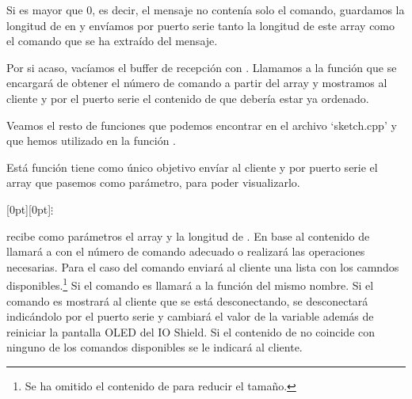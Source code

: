 
Si  es mayor que 0, es decir, el mensaje no contenía solo el comando, guardamos la longitud de  en  y envíamos por puerto serie tanto la longitud de este array como el comando que se ha extraído del mensaje.


Por si acaso, vacíamos el buffer de recepción con . Llamamos a la función  que se encargará de obtener el número de comando a partir del array  y mostramos al cliente y por el puerto serie el contenido de  que debería estar ya ordenado.

Veamos el resto de funciones que podemos encontrar en el archivo `sketch.cpp' y que hemos utilizado en la función .


Está función tiene como único objetivo envíar al cliente y por puerto serie el array que pasemos como parámetro, para poder visualizarlo.


\centerline{\raisebox{-1pt}[0pt][0pt]{$\vdots$}}

 recibe como parámetros el array  y la longitud de . En base al contenido de  llamará a  con el número de comando adecuado o realizará las operaciones necesarias. Para el caso del comando  enviará al cliente una lista con los camndos disponibles.\footnote{Se ha omitido el contenido de  para reducir el tamaño.} Si el comando es  llamará a la función del mismo nombre. Si el comando es  mostrará al cliente que se está desconectando, se desconectará indicándolo por el puerto serie y cambiará el valor de la variable  además de reiniciar la pantalla OLED del IO Shield. Si el contenido de  no coincide con ninguno de los comandos disponibles se le indicará al cliente.

